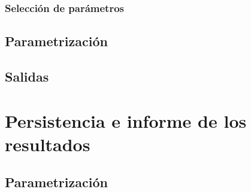 \subsubsection{Selección de parámetros}
\cite{pe2}
\subsection{Parametrización}
\subsection{Salidas}
\section{Persistencia e informe de los resultados}
\subsection{Parametrización}

